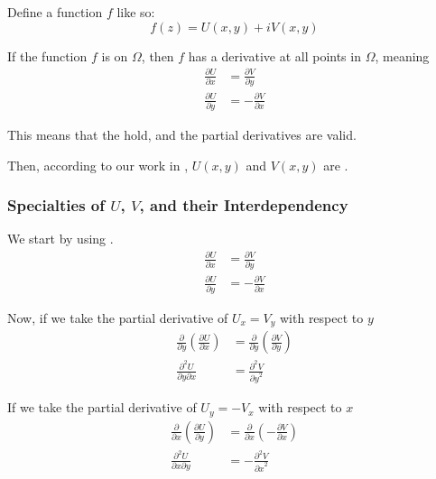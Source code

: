 \begin{theorem}\label{thm:Motivate_UV_Harmonic}
  Define a function $f$ like so:
  \begin{equation*}
    f(z) = U(x, y) + i V(x, y)
  \end{equation*}

  If the function $f$ is  on $\Omega$, then $f$ has a derivative at all points in $\Omega$, meaning
  \begin{align*}
    \frac{\partial U}{\partial x} &= \frac{\partial V}{\partial y} \\
    \frac{\partial U}{\partial y} &= -\frac{\partial V}{\partial x}
  \end{align*}

  This means that the  hold, and the partial derivatives are valid.

  Then, according to our work in , $U(x, y)$ and $V(x, y)$ are .
\end{theorem}

\subsubsection{Specialties of $U$, $V$, and their Interdependency}\label{subsubsec:Special_U_V_Interdependency}
We start by using .
\begin{align*}
  \frac{\partial U}{\partial x} &= \frac{\partial V}{\partial y} \\
  \frac{\partial U}{\partial y} &= -\frac{\partial V}{\partial x}
\end{align*}

Now, if we take the partial derivative of $U_{x} = V_{y}$ with respect to $y$
\begin{align*}
  \frac{\partial}{\partial y} \left( \frac{\partial U}{\partial x} \right) &= \frac{\partial}{\partial y} \left( \frac{\partial V}{\partial y} \right) \\
  \frac{\partial^{2} U}{\partial y \partial x} &= \frac{\partial^{2} V}{{\partial y}^{2}}
\end{align*}

If we take the partial derivative of $U_{y} = -V_{x}$ with respect to $x$
\begin{align*}
  \frac{\partial}{\partial x} \left( \frac{\partial U}{\partial y} \right) &= \frac{\partial}{\partial x} \left( -\frac{\partial V}{\partial x} \right) \\
  \frac{\partial^{2} U}{\partial x \partial y} &= -\frac{\partial^{2} V}{{\partial x}^{2}}
\end{align*}

